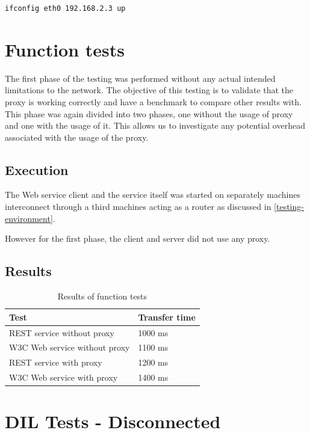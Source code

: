 \begin{lstlisting}[frame=single, caption="Configuring a network interface", label=listing-ifconfig]
ifconfig eth0 192.168.2.3 up

\end{lstlisting}

\section{Function tests}

The first phase of the testing was performed without any actual intended
limitations to the network. The objective of this testing is to validate that
the proxy is working correctly and have a benchmark to compare other results
with. This phase was again divided into two phases, one without the usage of
proxy and one with the usage of it. This allows us to investigate any potential
overhead associated with the usage of the proxy.

\subsection{Execution}

The Web service client and the service itself was started on separately machines
interconnect through a third machines acting as a router as discussed in
\cref{testing-environment}.

However for the first phase, the client and server did not use any proxy.

\subsection{Results}
\begin{table}[h]
\begin{tabular}{| l | l |}
\hline
  \textbf{Test} & \textbf{Transfer time} \\ \hline
  REST service without proxy & 1000 ms \\ \hline
  W3C Web service without proxy & 1100 ms \\ \hline
  REST service with proxy & 1200 ms \\ \hline
  W3C Web service with proxy & 1400 ms \\ \hline
\end{tabular}
\caption{Results of function tests}
\end{table}


\section{DIL Tests - Disconnected}

